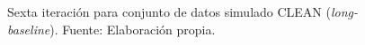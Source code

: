 \begin{figure}[!ht]
 \caption[Sexta iteración para conjunto de datos simulado CLEAN (\textit{long-baseline})]{Sexta iteración para conjunto de datos simulado CLEAN (\textit{long-baseline}). Fuente: Elaboración propia.}
 \label{fig:phasecal_6ter}
\end{figure}

